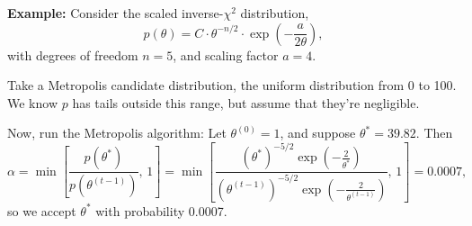 \documentclass[thesis.tex]{subfiles}
\begin{document}
\bigskip

\noindent\textbf{Example:} Consider the scaled inverse-\(\chi^2\) distribution, \[
  p(\theta) = C \cdot \theta^{-n/2} \cdot \exp \left(-\frac{a}{2\theta}\right),
\] with degrees of freedom \(n = 5\), and scaling factor \(a = 4\).

Take a Metropolis candidate distribution, the uniform distribution from 0 to 100. We know \(p\) has tails outside this range, but assume that they're negligible.

Now, run the Metropolis algorithm: Let \(\theta^{(0)} = 1\), and suppose \(\theta^* = 39.82\). Then \[
  \alpha = \min\left[ \frac{p(\theta^*)}{p(\theta^{(t-1)})} ,\, 1\right] = \min\left[ \frac{(\theta^*)^{-5/2} \exp\left( -\frac{2}{\theta^*} \right)}{(\theta^{(t-1)})^{-5/2} \exp\left( -\frac{2}{\theta^{(t-1)}} \right)},\, 1 \right] = 0.0007,
\] so we accept \(\theta^*\) with probability 0.0007.

\begin{comment}
Plot of first 500 values shows long flat periods---this is called \term{poorly-mixing}. TODO

In contrast, suppose we use \(\chi^2(1)\) as the proposal distribution. This no longer meets the assumptions of Metroplis (\(q(\theta_2) \ne q(\theta_1)\)), so we use Metropolis-Hastings. Now the plot looks morel ike white noise, and we say that it is \term{well-mixing}. TODO
\end{comment}
\end{document}
